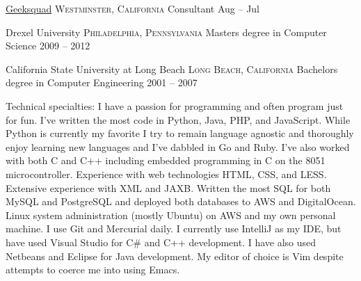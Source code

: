 \headedsection
  {\href{http://www.geeksquad.com/}{Geeksquad}}
  {\textsc{Westminster, California}} {%
  \headedsubsection
  { Consultant}
    {Aug -- Jul}
    {}
}



\spacedhrule{-0.2em}{-0.4em}


\headedsection
  {Drexel University}
  {\textsc{Philadelphia, Pennsylvania}} {%
  \headedsubsection
    {Masters degree in Computer Science}
    {2009 -- 2012}
    {}
}

\headedsection
  {California State University at Long Beach}
  {\textsc{Long Beach, California}} {%
  \headedsubsection
    {Bachelors degree in Computer Engineering}
    {2001 -- 2007} 
    {}
}

\spacedhrule{0.5em}{-0.4em}


\inlineheadsection  %
  {Technical specialties:}
  {I have a passion for programming and often program just for fun. I've written the
  most code in Python, Java, PHP, and JavaScript. While Python is currently my 
  favorite I try to remain language agnostic and thoroughly enjoy learning new
  languages and I've dabbled in {Go} and {Ruby}. I've also worked with both C and C++ including embedded programming
  in C on the 8051 microcontroller. Experience with web 
  technologies {HTML}, {CSS}, and {LESS}. Extensive experience with
  {XML} and {JAXB}. Written the most {SQL} for both {MySQL} and {PostgreSQL} and
  deployed both databases to {AWS} and {DigitalOcean}. Linux system
  administration (mostly Ubuntu) on {AWS} and my own personal machine. 
  I use {Git} and Mercurial daily. I currently use IntelliJ as my IDE, but have used Visual 
  Studio for {C\#} and {C++} development. I have also used {Netbeans} and 
  {Eclipse} for Java development. My editor of choice is Vim despite 
  attempts to coerce me into using Emacs.}

